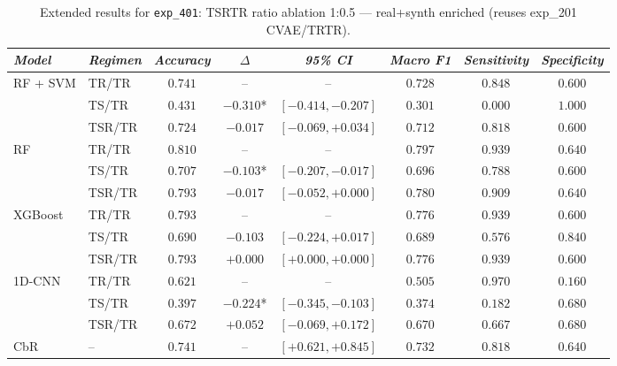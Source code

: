 \begin{table}[H]
\centering
\scriptsize
\caption{Extended results for \texttt{exp\_401}: TSRTR ratio ablation 1:0.5 — real+synth enriched (reuses exp\_201 CVAE/TRTR).}
\label{tab:appendix_exp_401}
\begin{tabular*}{\textwidth}{@{\extracolsep{\fill}}llcccccc}
\toprule
\emph{Model} & \emph{Regimen} & \emph{Accuracy} & \emph{$\Delta$} & \emph{95\% CI} & \emph{Macro F1} & \emph{Sensitivity} & \emph{Specificity}\\
\midrule
\multirow{3}{*}{RF + SVM} & TR/TR & $0.741$ & -- & -- & $0.728$ & $0.848$ & $0.600$\\
 & TS/TR & $0.431$ & $-0.310$* & $[-0.414, -0.207]$ & $0.301$ & $0.000$ & $1.000$\\
 & TSR/TR & $0.724$ & $-0.017$ & $[-0.069, +0.034]$ & $0.712$ & $0.818$ & $0.600$\\
\midrule
\multirow{3}{*}{RF} & TR/TR & $0.810$ & -- & -- & $0.797$ & $0.939$ & $0.640$\\
 & TS/TR & $0.707$ & $-0.103$* & $[-0.207, -0.017]$ & $0.696$ & $0.788$ & $0.600$\\
 & TSR/TR & $0.793$ & $-0.017$ & $[-0.052, +0.000]$ & $0.780$ & $0.909$ & $0.640$\\
\midrule
\multirow{3}{*}{XGBoost} & TR/TR & $0.793$ & -- & -- & $0.776$ & $0.939$ & $0.600$\\
 & TS/TR & $0.690$ & $-0.103$ & $[-0.224, +0.017]$ & $0.689$ & $0.576$ & $0.840$\\
 & TSR/TR & $0.793$ & $+0.000$ & $[+0.000, +0.000]$ & $0.776$ & $0.939$ & $0.600$\\
\midrule
\multirow{3}{*}{1D-CNN} & TR/TR & $0.621$ & -- & -- & $0.505$ & $0.970$ & $0.160$\\
 & TS/TR & $0.397$ & $-0.224$* & $[-0.345, -0.103]$ & $0.374$ & $0.182$ & $0.680$\\
 & TSR/TR & $0.672$ & $+0.052$ & $[-0.069, +0.172]$ & $0.670$ & $0.667$ & $0.680$\\
\midrule
CbR & -- & $0.741$ & -- & $[+0.621, +0.845]$ & $0.732$ & $0.818$ & $0.640$\\
\bottomrule
\end{tabular*}
\end{table}

